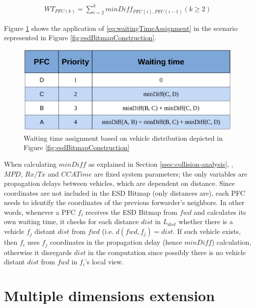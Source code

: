 			\begin{gather}
				WT_{PFC(k)} = \sum_{i=2}^{k} minDiff_{PFC(i),PFC(i-1)} (k \geq 2)
				\label{eq:waitingTimeAssignment}
			\end{gather}
			
			Figure \ref{fig:waitingTimeAssignment} shows the application of \ref{eq:waitingTimeAssignment} in the scenario represented in Figure \ref{fig:esdBitmapConstruction}.
			
			\begin{figure}[H]
				\centering
				\includegraphics[width=\textwidth]{immagini/waitingTimeAssignment}
				\caption{Waiting time assignment based on vehicle distribution depicted in Figure \ref{fig:esdBitmapConstruction}}
				\label{fig:waitingTimeAssignment}
			\end{figure}
			
			When calculating $minDiff$ as explained in Section \ref{ssec:collision-analysis}, , $MPD$, $Rx/Tx$ and $CCATime$ are fixed system parameters; the only variables are propagation delays between vehicles, which are dependent on distance. Since coordinates are not included in the ESD Bitmap (only distances are), each PFC needs to identify the coordinates of the previous forwarder's neighbors. In other words, whenever a PFC $f_i$ receives the ESD Bitmap from $fwd$ and calculates its own waiting time, it checks for each distance $dist$ in $L_{dist}$ whether there is a vehicle $f_j$ distant $dist$ from $fwd$ (i.e. $d(fwd, f_j) = dist$. If such vehicle exists, then $f_i$ uses $f_j$ coordinates in the propagation delay (hence $minDiff$) calculation, otherwise it disregards $dist$ in the computation since possibly there is no vehicle distant $dist$ from $fwd$ in $f_i$'s local view.
			
	\section{Multiple dimensions extension}
		
